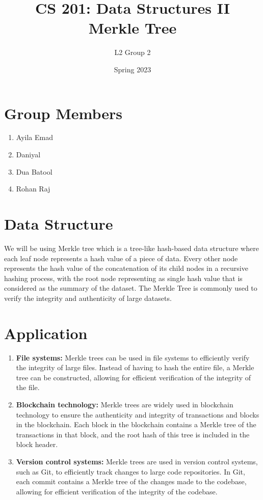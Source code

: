 \documentclass{article}
\title {CS 201: Data Structures II \\Merkle Tree} %
\author{L2 Group 2} %
\date{Spring 2023}
\begin{document}
\maketitle
\section{Group Members}
\begin{enumerate}
  \item Ayila Emad
  \item Daniyal
  \item Dua Batool
  \item Rohan Raj
\end{enumerate}
\section{Data Structure}
We will be using Merkle tree which is a tree-like hash-based data structure where each leaf node represents a hash value of a piece of data. Every other node represents the hash value of the concatenation of its child nodes in a recursive hashing process, with the root node representing as single hash value that is considered as the summary of the dataset. The Merkle Tree is commonly used to verify the integrity and authenticity of large datasets. 
\section{Application}
\begin{enumerate}
    \item \textbf{File systems:} Merkle trees can be used in file systems to efficiently verify the integrity of large files. Instead of having to hash the entire file, a Merkle tree can be constructed, allowing for efficient verification of the integrity of the file.
    \item \textbf{Blockchain technology:} Merkle trees are widely used in blockchain technology to ensure the authenticity and integrity of transactions and blocks in the blockchain. Each block in the blockchain contains a Merkle tree of the transactions in that block, and the root hash of this tree is included in the block header.
    \item \textbf{Version control systems:} Merkle trees are used in version control systems, such as Git, to efficiently track changes to large code repositories. In Git, each commit contains a Merkle tree of the changes made to the codebase, allowing for efficient verification of the integrity of the codebase.
\end{enumerate}
\end{document}
